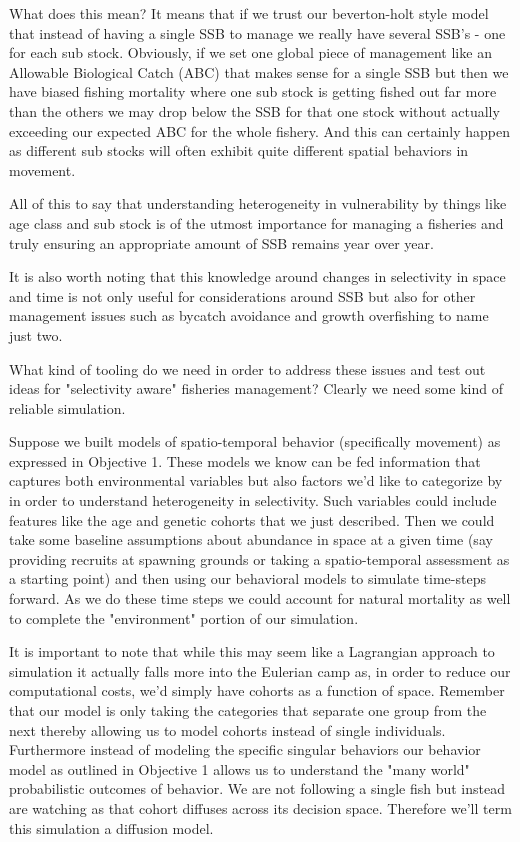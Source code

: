 \documentclass[11pt]{article}
\begin{document}
What does this mean? It means that if we trust our beverton-holt style model that instead of having a single SSB to manage we really have several SSB's - one for each sub stock. Obviously, if we set one global piece of management like an Allowable Biological Catch (ABC) that makes sense for a single SSB but then we have biased fishing mortality where one sub stock is getting fished out far more than the others we may drop below the SSB for that one stock without actually exceeding our expected ABC for the whole fishery. And this can certainly happen as different sub stocks will often exhibit quite different spatial behaviors in movement. \newline

All of this to say that understanding heterogeneity in vulnerability by things like age class and sub stock is of the utmost importance for managing a fisheries and truly ensuring an appropriate amount of SSB remains year over year. 

It is also worth noting that this knowledge around changes in selectivity in space and time is not only useful for considerations around SSB but also for other management issues such as bycatch avoidance and growth overfishing to name just two. 

What kind of tooling do we need in order to address these issues and test out ideas for "selectivity aware" fisheries management? Clearly we need some kind of reliable simulation. \newline

Suppose we built models of spatio-temporal behavior (specifically movement) as expressed in Objective 1. These models we know can be fed information that captures both environmental variables but also factors we'd like to categorize by in order to understand heterogeneity in selectivity. Such variables could include features like the age and genetic cohorts that we just described. Then we could take some baseline assumptions about abundance in space at a given time (say providing recruits at spawning grounds or taking a spatio-temporal assessment as a starting point) and then using our behavioral models to simulate time-steps forward. As we do these time steps we could account for natural mortality as well to complete the "environment" portion of our simulation. 

It is important to note that while this may seem like a Lagrangian approach to simulation it actually falls more into the Eulerian camp as, in order to reduce our computational costs, we'd simply have cohorts as a function of space. Remember that our model is only taking the categories that separate one group from the next thereby allowing us to model cohorts instead of single individuals. Furthermore instead of modeling the specific singular behaviors our behavior model as outlined in Objective 1 allows us to understand the "many world" probabilistic outcomes of behavior. We are not following a single fish but instead are watching as that cohort diffuses across its decision space. Therefore we'll term this simulation a diffusion model.
\end{document}
